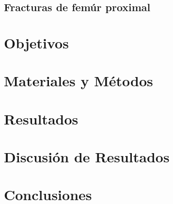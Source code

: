 \documentclass[letterpaper,12pt,oneside]{book}
\begin{document}
    \section{Fracturas de femúr proximal}

    \chapter{Objetivos}
    \chapter{Materiales y Métodos}

    \chapter{Resultados}
    \chapter{Discusión de Resultados}
    \chapter{Conclusiones}
\end{document}
